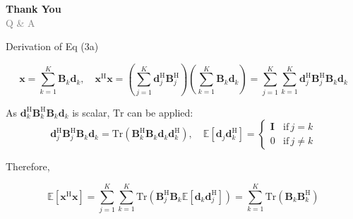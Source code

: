 \documentclass[aspectratio=169, 10pt]{beamer}
\begin{document}
\section{}
\begin{frame}{}
    \centering
    \Large \textbf{\textcolor{ku_crimson}{Thank You}} \\
    \vspace{0.5cm}
    \small \textcolor{gray}{Q \& A}
\end{frame}

\appendix

\begin{frame}[label=app-power_constraint]{Derivation of Eq (3a)}


    \begin{equation*}
        \mathbf{x} = \sum_{k=1}^K \mathbf{B}_k\mathbf{d}_k,\quad
        \mathbf{x}^\mathrm{H}\mathbf{x} =
        \left(\sum_{j=1}^K \mathbf{d}_j^\mathrm{H} \mathbf{B}_j^\mathrm{H}\right)
        \left(\sum_{k=1}^K \mathbf{B}_k\mathbf{d}_k\right)
        = \sum_{j=1}^K \sum_{k=1}^K \mathbf{d}_j^\mathrm{H} \mathbf{B}_j^\mathrm{H}\mathbf{B}_k\mathbf{d}_k
    \end{equation*}

    As $\mathbf{d}_k^\mathrm{H} \mathbf{B}_k^\mathrm{H}\mathbf{B}_k\mathbf{d}_k$ is scalar, $\mathrm{Tr}$ can be applied:
    \begin{equation*}
        \mathbf{d}_j^\mathrm{H} \mathbf{B}_j^\mathrm{H}\mathbf{B}_k\mathbf{d}_k
        = \mathrm{Tr}( \mathbf{B}_k^\mathrm{H}\mathbf{B}_k\mathbf{d}_k\mathbf{d}_k^\mathrm{H}),\quad
        \mathbb{E}[\mathbf{d}_j\mathbf{d}_k^\mathrm{H}] = \begin{cases}
            \mathbf{I} & \mathrm{if }\, j = k    \\
            0          & \mathrm{if }\, j \neq k
        \end{cases}
    \end{equation*}

    Therefore,

    \begin{equation*}
        \mathbb{E}[\mathbf{x}^\mathrm{H}\mathbf{x}] =
        \sum_{j=1}^K \sum_{k=1}^K \mathrm{Tr}( \mathbf{B}_j^\mathrm{H}\mathbf{B}_k
        \mathbb{E}[\mathbf{d}_k\mathbf{d}_j^\mathrm{H}])
        = \sum_{k=1}^K\mathrm{Tr}(\mathbf{B}_k\mathbf{B}_k^\mathrm{H})
    \end{equation*}
    \begin{flushright}
        \hyperlink{main-power_constraint}{}
    \end{flushright}
\end{frame}
\end{document}
